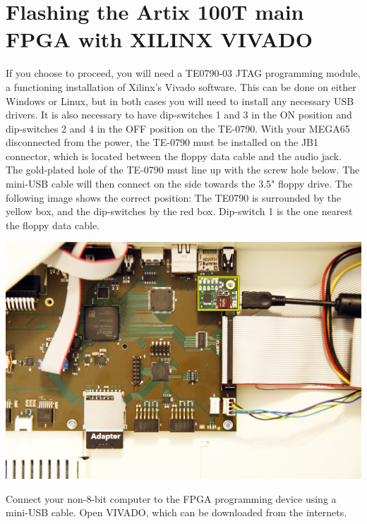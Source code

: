 \section{Flashing the Artix 100T main FPGA with XILINX VIVADO}

If you choose to proceed, you will need a TE0790-03 JTAG programming module, a functioning
installation of Xilinx's Vivado software.  This can be done on either Windows or Linux, but
in both cases you will need to install any necessary USB drivers. It is also necessary to have 
dip-switches 1 and 3 in the ON position and dip-switches 2 and 4 in the OFF position on the TE-0790.
With your MEGA65 disconnected from the power, the TE-0790 must be installed on the JB1 connector,
which is located between the floppy data cable and the audio jack.
The gold-plated hole of the TE-0790 must line up with the screw
hole below.  The mini-USB cable will then connect on the side towards the 3.5" floppy drive.
The following image shows the correct position: The TE0790 is surrounded by the yellow box,
and the dip-switches by the red box. Dip-switch 1 is the one nearest the floppy data cable.


\includegraphics[width=\linewidth]{images/jtag_detail_02.jpg}


Connect your non-8-bit computer to the FPGA programming device using a mini-USB cable. Open VIVADO, which can be downloaded from the internets.

